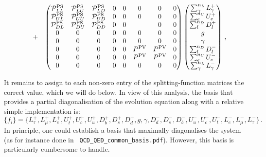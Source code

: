 \documentclass[10pt,a4paper]{article}
\begin{document}
\begin{equation}
\begin{array}{rcl}
\\
&+&
\displaystyle 
\begin{pmatrix}
\mathcal{P}^{\rm PS}_{LL} & \mathcal{P}^{\rm PS}_{LU} & \mathcal{P}^{\rm PS}_{LD}& 0  & 0&0 &0 & 0\\ 
\mathcal{P}^{\rm PS}_{UL} & \mathcal{P}^{\rm PS}_{UU} & \mathcal{P}^{\rm PS}_{UD} & 0  & 0&0 &0 &0 \\ 
\mathcal{P}^{\rm PS}_{DL} & \mathcal{P}^{\rm PS}_{DU} & \mathcal{P}^{\rm PS}_{DD} & 0  & 0& &0 &0 \\ 
0 & 0 & 0 & 0 & 0 & 0 & 0 & 0\\
0 & 0 & 0 & 0 & 0 & 0 & 0 & 0\\
0& 0&0 & 0  & 0& P^{\rm PV} & P^{\rm PV} & 0\\
0& 0& 0& 0  & 0& P^{\rm PV} & P^{\rm PV} & 0\\
0& 0&0 & 0  & 0& 0 & 0 & 0
\end{pmatrix}
\begin{pmatrix}
\sum_\gamma^{n_L} L_\gamma^+\\
\sum_e^{n_U} U_e^+ \\
\sum_l^{n_D} D_l^+\\
g\\
\gamma\\
\sum_l^{n_D} D_l^-\\
\sum_e^{n_U} U_e^-\\
\sum_\gamma^{n_L} L_\gamma^-
\end{pmatrix}\,,
\end{array}
\end{equation}

It remains to assign to each non-zero entry of the splitting-function
matrices the correct value, which we will do below. In view of this
analysis, the basis that provides a partial diagonalisation of the
evolution equation along with a relative simple implementation is:
\begin{equation}
\{f_i\}=\{L_\tau^+, L_\mu^+,L_e^+,U_t^+,U_c^+,U_u^+,D_b^+,D_s^+,D_d^+,g,\gamma,D_d^-,D_s^-,D_b^-,U_u^-,U_c^-,U_t^-,L_e^-,L_\mu^-,L_\tau^-\}\,.
\label{eq:QCDQEDbasis}
\end{equation}
In principle, one could establish a basis that maximally diagonalises
the system (as for instance done in {\tt
  QCD\_QED\_common\_basis.pdf}). However, this basis is particularly
cumbersome to handle.
\end{document}
